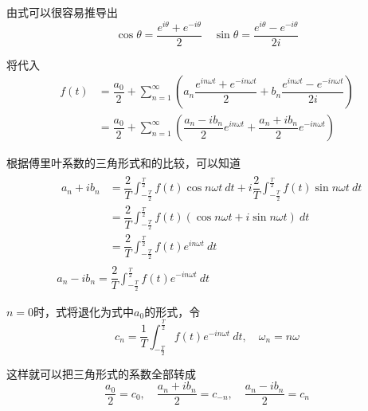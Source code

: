         由式可以很容易推导出
        \begin{equation}
            \cos\theta =\dfrac{e^{i\theta}+e^{-i\theta}}{2}\quad \sin\theta = \dfrac{e^{i\theta}-e^{-i\theta}}{2i}
            \label{eq: 1.3}
        \end{equation}

        将代入
        \begin{equation}
            \begin{split}
                f(t)&=\dfrac{a_0}{2}+\sum\limits_{n = 1}^\infty(a_n\dfrac{e^{in\omega t}+e^{-in\omega t}}{2}+b_n\dfrac{e^{in\omega t}-e^{-in\omega t}}{2i})\\
                &= \dfrac{a_0}{2}+\sum\limits_{n = 1}^\infty(\dfrac{a_n-i b_n}{2}e^{in\omega t}+\dfrac{a_n+i b_n}{2}e^{-in\omega t})
            \end{split}
            \label{eq: 1.4}
        \end{equation}
        
        根据傅里叶系数的三角形式和的比较，可以知道
        \begin{equation}
            \begin{split}
                &\begin{split}
                    a_n+ib_n&=\dfrac{2}{T}\int_{-\frac{T}{2}}^{\frac{T}{2}}f(t)\cos n\omega t\ dt+i\dfrac{2}{T}\int_{-\frac{T}{2}}^{\frac{T}{2}}f(t)\sin n\omega t\ dt\\
                    &= \dfrac{2}{T}\int_{-\frac{T}{2}}^{\frac{T}{2}}f(t)(\cos n\omega t+i\sin n\omega t)\ dt\\
                    &= \dfrac{2}{T}\int_{-\frac{T}{2}}^{\frac{T}{2}}f(t)e^{in\omega t}\ dt
                \end{split}\\
                &a_n-ib_n=\dfrac{2}{T}\int_{-\frac{T}{2}}^{\frac{T}{2}}f(t)e^{-in\omega t}\ dt
            \end{split}
            \label{eq: 1.5}
        \end{equation}

        $n=0$时，式将退化为式中$a_0$的形式，令
        \begin{equation}
            c_n=\dfrac{1}{T}\int_{-\frac{T}{2}}^{\frac{T}{2}}f(t)e^{-in\omega t}\ dt, \quad \omega_n=n\omega
            \label{eq: 1.6}
        \end{equation}

        这样就可以把三角形式的系数全部转成
        \begin{equation}
            \dfrac{a_0}{2}=c_0,\quad
            \dfrac{a_n+ib_n}{2}=c_{-n},\quad
            \dfrac{a_n-ib_n}{2}=c_{n}
            \label{eq: 1.7}
        \end{equation}

